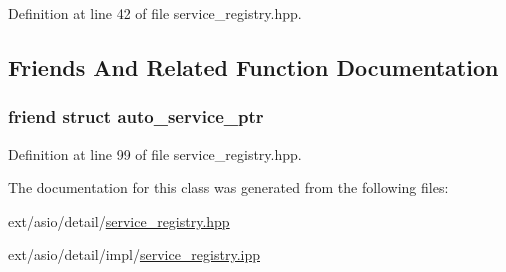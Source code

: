Definition at line 42 of file service\+\_\+registry.\+hpp.



\subsection{Friends And Related Function Documentation}
\hypertarget{classasio_1_1detail_1_1service__registry_a64b74d68589accc1f2296e4e9ebe0994}{}
\subsubsection[{auto\+\_\+service\+\_\+ptr}]{\setlength{\rightskip}{0pt plus 5cm}friend struct auto\+\_\+service\+\_\+ptr\hspace{0.3cm}{\ttfamily [friend]}}\label{classasio_1_1detail_1_1service__registry_a64b74d68589accc1f2296e4e9ebe0994}


Definition at line 99 of file service\+\_\+registry.\+hpp.



The documentation for this class was generated from the following files\+:\begin{DoxyCompactItemize}
\item 
ext/asio/detail/\hyperlink{service__registry_8hpp}{service\+\_\+registry.\+hpp}\item 
ext/asio/detail/impl/\hyperlink{service__registry_8ipp}{service\+\_\+registry.\+ipp}\end{DoxyCompactItemize}
